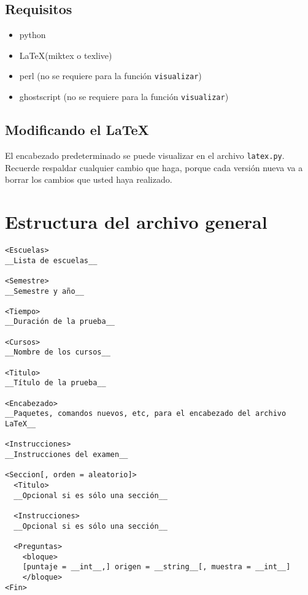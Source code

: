 \documentclass[12pt]{article}
\theoremstyle{definition}
\begin{document}
\subsection{Requisitos}
\begin{itemize}
  \item python
  \item \LaTeX (miktex o texlive)
  \item perl (no se requiere para la funci\'on \verb|visualizar|)
  \item ghostscript (no se requiere para la funci\'on \verb|visualizar|)
\end{itemize}

\subsection{Modificando el \LaTeX}
El encabezado predeterminado se puede visualizar en el archivo \verb|latex.py|. Recuerde respaldar cualquier cambio que haga, porque cada versi\'on nueva va a borrar los cambios que usted haya realizado.

\newpage
\section{Estructura del archivo general}
\begin{verbatim}
<Escuelas>
__Lista de escuelas__

<Semestre>
__Semestre y año__

<Tiempo>
__Duración de la prueba__

<Cursos>
__Nombre de los cursos__

<Titulo>
__Título de la prueba__

<Encabezado>
__Paquetes, comandos nuevos, etc, para el encabezado del archivo LaTeX__

<Instrucciones>
__Instrucciones del examen__

<Seccion[, orden = aleatorio]>
  <Titulo>
  __Opcional si es sólo una sección__

  <Instrucciones>
  __Opcional si es sólo una sección__

  <Preguntas>
    <bloque>
    [puntaje = __int__,] origen = __string__[, muestra = __int__]
    </bloque>
<Fin>
\end{verbatim}
\end{document}
